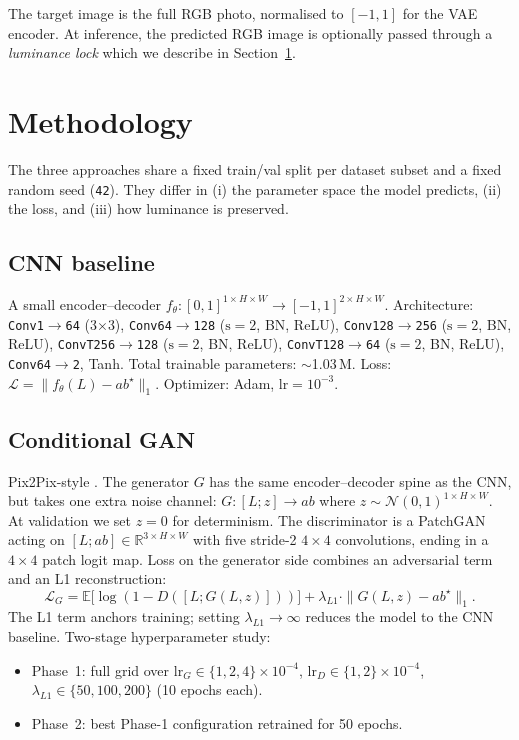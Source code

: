 \documentclass[conference]{IEEEtran}
\begin{document}
The target image is the full RGB photo, normalised to $[-1,1]$ for the
VAE encoder. At inference, the predicted RGB image is optionally
passed through a \emph{luminance lock} which we describe in
Section~\ref{sec:meth}.

\section{Methodology}\label{sec:meth}

The three approaches share a fixed train/val split per dataset subset
and a fixed random seed (\texttt{42}). They differ in (i) the
parameter space the model predicts, (ii) the loss, and (iii) how
luminance is preserved.

\subsection{CNN baseline}\label{sec:cnn}
A small encoder--decoder $f_\theta:[0,1]^{1\times H\times W}\!\to\![-1,1]^{2\times H\times W}$.
Architecture: \texttt{Conv1$\to$64} (3$\times$3), \texttt{Conv64$\to$128}
($\text{s}=2$, BN, ReLU), \texttt{Conv128$\to$256} ($\text{s}=2$, BN,
ReLU), \texttt{ConvT256$\to$128} ($\text{s}=2$, BN, ReLU),
\texttt{ConvT128$\to$64} ($\text{s}=2$, BN, ReLU),
\texttt{Conv64$\to$2}, Tanh. Total trainable parameters:
$\sim$1.03\,M. Loss: $\mathcal{L}=\| f_\theta(L)-ab^\star\|_1$.
Optimizer: Adam, lr$=10^{-3}$.

\subsection{Conditional GAN}\label{sec:cgan}
Pix2Pix-style \cite{isola2017image}. The generator $G$ has the same
encoder--decoder spine as the CNN, but takes one extra noise channel:
$G:[L; z]\to ab$ where $z\sim\mathcal{N}(0,1)^{1\times H\times W}$.
At validation we set $z=0$ for determinism. The discriminator is a
PatchGAN \cite{isola2017image} acting on
$[L; ab]\in\mathbb{R}^{3\times H\times W}$ with five stride-2
$4\times4$ convolutions, ending in a $4\times4$ patch logit map. Loss
on the generator side combines an adversarial term and an L1
reconstruction:
\begin{equation}
  \mathcal{L}_G = \mathbb{E}\big[\log(1-D([L; G(L,z)]))\big]
              + \lambda_{L1}\cdot\| G(L,z) - ab^\star\|_1.
\end{equation}
The L1 term anchors training; setting $\lambda_{L1}\!\to\!\infty$
reduces the model to the CNN baseline. Two-stage hyperparameter
study:
\begin{itemize}
  \item Phase~1: full grid over
        $\mathrm{lr}_G\in\{1,2,4\}\!\times\!10^{-4}$,
        $\mathrm{lr}_D\in\{1,2\}\!\times\!10^{-4}$,
        $\lambda_{L1}\in\{50,100,200\}$ (10 epochs each).
  \item Phase~2: best Phase-1 configuration retrained for 50 epochs.
\end{itemize}
\end{document}
